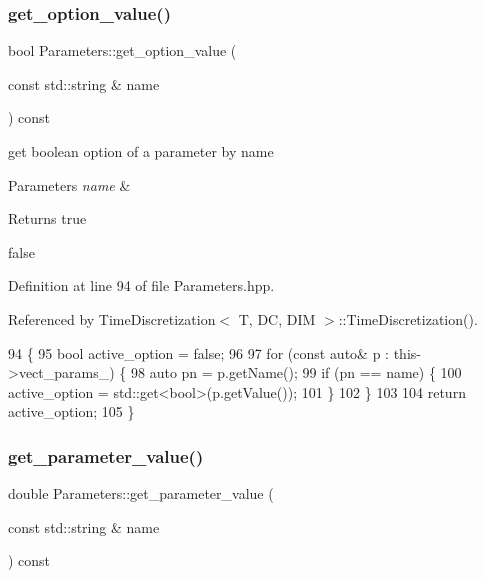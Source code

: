 \subsubsection{\texorpdfstring{get\+\_\+option\+\_\+value()}{get\_option\_value()}}
{\footnotesize\ttfamily bool Parameters\+::get\+\_\+option\+\_\+value (\begin{DoxyParamCaption}\item[{const std\+::string \&}]{name }\end{DoxyParamCaption}) const}



get boolean option of a parameter by name 


\begin{DoxyParams}{Parameters}
{\em name} & \\
\hline
\end{DoxyParams}
\begin{DoxyReturn}{Returns}
true 

false 
\end{DoxyReturn}


Definition at line 94 of file Parameters.\+hpp.



Referenced by Time\+Discretization$<$ T, D\+C, D\+I\+M $>$\+::\+Time\+Discretization().


\begin{DoxyCode}
94                                                              \{
95   \textcolor{keywordtype}{bool} active\_option = \textcolor{keyword}{false};
96 
97   \textcolor{keywordflow}{for} (\textcolor{keyword}{const} \textcolor{keyword}{auto}& p : this->vect\_params\_) \{
98     \textcolor{keyword}{auto} pn = p.getName();
99     \textcolor{keywordflow}{if} (pn == name) \{
100       active\_option = std::get<bool>(p.getValue());
101     \}
102   \}
103 
104   \textcolor{keywordflow}{return} active\_option;
105 \}
\end{DoxyCode}
\mbox{\label{classParameters_ab1bac6bf07b9698c850542b68e143ef3}} 
\subsubsection{\texorpdfstring{get\+\_\+parameter\+\_\+value()}{get\_parameter\_value()}}
{\footnotesize\ttfamily double Parameters\+::get\+\_\+parameter\+\_\+value (\begin{DoxyParamCaption}\item[{const std\+::string \&}]{name }\end{DoxyParamCaption}) const}



